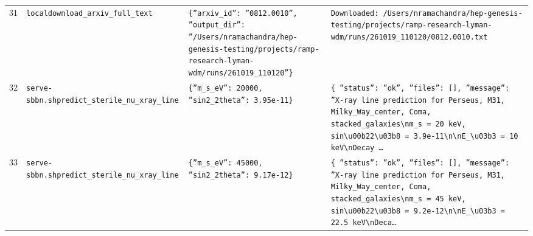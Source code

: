 \documentclass[11pt,a4paper]{article}
\begin{document}
\begin{longtable}{@{}p{}p{}p{}p{}@{}}
31 & \texttt{local}\newline\texttt{download\_\allowbreak{}arxiv\_\allowbreak{}full\_\allowbreak{}text} & \texttt{\{''arxiv\_\allowbreak{}id'':\allowbreak{} ''0812.0010'',\allowbreak{} ''output\_\allowbreak{}dir'':\allowbreak{} ''/\allowbreak{}Users/\allowbreak{}nramachandra/\allowbreak{}hep-genesis-testing/\allowbreak{}projects/\allowbreak{}ramp-research-lyman-wdm/\allowbreak{}runs/\allowbreak{}261019\_\allowbreak{}110120''\}\allowbreak{}} & \texttt{Downloaded:\allowbreak{} /\allowbreak{}Users/\allowbreak{}nramachandra/\allowbreak{}hep-genesis-testing/\allowbreak{}projects/\allowbreak{}ramp-research-lyman-wdm/\allowbreak{}runs/\allowbreak{}261019\_\allowbreak{}110120/\allowbreak{}0812.0010.txt} \\
32 & \texttt{serve-sbbn.sh}\newline\texttt{predict\_\allowbreak{}sterile\_\allowbreak{}nu\_\allowbreak{}xray\_\allowbreak{}line} & \texttt{\{''m\_\allowbreak{}s\_\allowbreak{}eV'':\allowbreak{} 20000,\allowbreak{} ''sin2\_\allowbreak{}2theta'':\allowbreak{} 3.95e-11\}\allowbreak{}} & \texttt{\{   ''status'':\allowbreak{} ''ok'',\allowbreak{}   ''files'':\allowbreak{} []\allowbreak{},\allowbreak{}   ''message'':\allowbreak{} ''X-ray line prediction for Perseus,\allowbreak{} M31,\allowbreak{} Milky\_\allowbreak{}Way\_\allowbreak{}center,\allowbreak{} Coma,\allowbreak{} stacked\_\allowbreak{}galaxies\textbackslash{}\allowbreak{}nm\_\allowbreak{}s =\allowbreak{} 20 keV,\allowbreak{} sin\textbackslash{}\allowbreak{}u00b22\textbackslash{}\allowbreak{}u03b8 =\allowbreak{} 3.9e-11\textbackslash{}\allowbreak{}n\textbackslash{}\allowbreak{}nE\_\allowbreak{}\textbackslash{}\allowbreak{}u03b3 =\allowbreak{} 10 keV\textbackslash{}\allowbreak{}nDecay \ldots{}\allowbreak{}} \\
33 & \texttt{serve-sbbn.sh}\newline\texttt{predict\_\allowbreak{}sterile\_\allowbreak{}nu\_\allowbreak{}xray\_\allowbreak{}line} & \texttt{\{''m\_\allowbreak{}s\_\allowbreak{}eV'':\allowbreak{} 45000,\allowbreak{} ''sin2\_\allowbreak{}2theta'':\allowbreak{} 9.17e-12\}\allowbreak{}} & \texttt{\{   ''status'':\allowbreak{} ''ok'',\allowbreak{}   ''files'':\allowbreak{} []\allowbreak{},\allowbreak{}   ''message'':\allowbreak{} ''X-ray line prediction for Perseus,\allowbreak{} M31,\allowbreak{} Milky\_\allowbreak{}Way\_\allowbreak{}center,\allowbreak{} Coma,\allowbreak{} stacked\_\allowbreak{}galaxies\textbackslash{}\allowbreak{}nm\_\allowbreak{}s =\allowbreak{} 45 keV,\allowbreak{} sin\textbackslash{}\allowbreak{}u00b22\textbackslash{}\allowbreak{}u03b8 =\allowbreak{} 9.2e-12\textbackslash{}\allowbreak{}n\textbackslash{}\allowbreak{}nE\_\allowbreak{}\textbackslash{}\allowbreak{}u03b3 =\allowbreak{} 22.5 keV\textbackslash{}\allowbreak{}nDeca\ldots{}\allowbreak{}} \\

\end{longtable}
\end{document}
